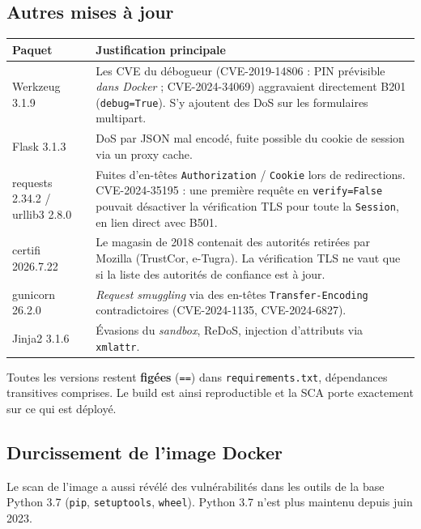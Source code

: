 \documentclass[11pt,a4paper]{article}
\newcommand{\code}[1]{\texttt{#1}}
\begin{document}
\subsection{Autres mises à jour}
\begin{table}[H]
\centering
\small
\begin{tabularx}{\textwidth}{@{}lL@{}}
\toprule
\textbf{Paquet} & \textbf{Justification principale} \\
\midrule
Werkzeug 3.1.9 & Les CVE du débogueur (CVE-2019-14806 : PIN prévisible \emph{dans Docker} ; CVE-2024-34069) aggravaient directement B201 (\code{debug=True}). S'y ajoutent des DoS sur les formulaires multipart. \\
Flask 3.1.3 & DoS par JSON mal encodé, fuite possible du cookie de session via un proxy cache. \\
requests 2.34.2 / urllib3 2.8.0 & Fuites d'en-têtes \code{Authorization} / \code{Cookie} lors de redirections. CVE-2024-35195 : une première requête en \code{verify=False} pouvait désactiver la vérification TLS pour toute la \code{Session}, en lien direct avec B501. \\
certifi 2026.7.22 & Le magasin de 2018 contenait des autorités retirées par Mozilla (TrustCor, e-Tugra). La vérification TLS ne vaut que si la liste des autorités de confiance est à jour. \\
gunicorn 26.2.0 & \emph{Request smuggling} via des en-têtes \code{Transfer-Encoding} contradictoires (CVE-2024-1135, CVE-2024-6827). \\
Jinja2 3.1.6 & Évasions du \emph{sandbox}, ReDoS, injection d'attributs via \code{xmlattr}. \\
\bottomrule
\end{tabularx}
\end{table}

\noindent Toutes les versions restent \textbf{figées} (\code{==}) dans \code{requirements.txt},
dépendances transitives comprises. Le build est ainsi reproductible et la SCA porte exactement
sur ce qui est déployé.

\subsection{Durcissement de l'image Docker}
Le scan de l'image a aussi révélé des vulnérabilités dans les outils de la base Python 3.7
(\code{pip}, \code{setuptools}, \code{wheel}). Python 3.7 n'est plus maintenu depuis juin 2023.
\end{document}
